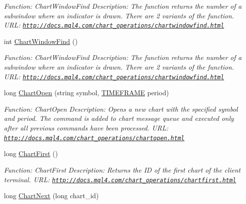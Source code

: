 \begin{DoxyCompactItemize}
\begin{DoxyCompactList}\small\item\em Function\+: Chart\+Window\+Find Description\+: The function returns the number of a subwindow where an indicator is drawn. There are 2 variants of the function. U\+RL\+: \href{http://docs.mql4.com/chart_operations/chartwindowfind.html}{\tt http\+://docs.\+mql4.\+com/chart\+\_\+operations/chartwindowfind.\+html} \end{DoxyCompactList}\item 
int \hyperlink{class_m_q_l4_c_sharp_1_1_base_1_1_m_q_l_base_a659bbccaa8cd7b277691737310211285}{Chart\+Window\+Find} ()
\begin{DoxyCompactList}\small\item\em Function\+: Chart\+Window\+Find Description\+: The function returns the number of a subwindow where an indicator is drawn. There are 2 variants of the function. U\+RL\+: \href{http://docs.mql4.com/chart_operations/chartwindowfind.html}{\tt http\+://docs.\+mql4.\+com/chart\+\_\+operations/chartwindowfind.\+html} \end{DoxyCompactList}\item 
long \hyperlink{class_m_q_l4_c_sharp_1_1_base_1_1_m_q_l_base_af5606269b94fc7456eee42d0526ed9f1}{Chart\+Open} (string symbol, \hyperlink{namespace_m_q_l4_c_sharp_1_1_base_1_1_enums_a838810aaa87c63c12737408dba8c0b35}{T\+I\+M\+E\+F\+R\+A\+ME} period)
\begin{DoxyCompactList}\small\item\em Function\+: Chart\+Open Description\+: Opens a new chart with the specified symbol and period. The command is added to chart message queue and executed only after all previous commands have been processed. U\+RL\+: \href{http://docs.mql4.com/chart_operations/chartopen.html}{\tt http\+://docs.\+mql4.\+com/chart\+\_\+operations/chartopen.\+html} \end{DoxyCompactList}\item 
long \hyperlink{class_m_q_l4_c_sharp_1_1_base_1_1_m_q_l_base_aed9f8cf16a764c6519147aa323c6b40d}{Chart\+First} ()
\begin{DoxyCompactList}\small\item\em Function\+: Chart\+First Description\+: Returns the ID of the first chart of the client terminal. U\+RL\+: \href{http://docs.mql4.com/chart_operations/chartfirst.html}{\tt http\+://docs.\+mql4.\+com/chart\+\_\+operations/chartfirst.\+html} \end{DoxyCompactList}\item 
long \hyperlink{class_m_q_l4_c_sharp_1_1_base_1_1_m_q_l_base_a89906ad954e74f1258fa2bd0a84d4839}{Chart\+Next} (long chart\+\_\+id)

\end{DoxyCompactItemize}

